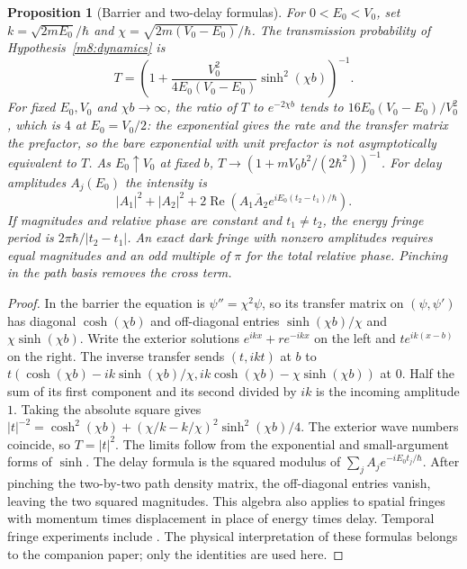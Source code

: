 \documentclass[11pt,reqno]{amsart}
\newtheorem{proposition}[theorem]{Proposition}
\theoremstyle{definition}
\theoremstyle{remark}
\numberwithin{equation}{section}
\begin{document}
\begin{proposition}[Barrier and two-delay formulas]\label{m8:barrier}
For $0<E_0<V_0$, set $k=\sqrt{2mE_0}/\hbar$ and
$\chi=\sqrt{2m(V_0-E_0)}/\hbar$. The transmission probability of
Hypothesis~\ref{m8:dynamics} is
\[
 T=\left(1+\frac{V_0^2}{4E_0(V_0-E_0)}\sinh^2(\chi b)\right)^{-1}.
\]
For fixed $E_0,V_0$ and $\chi b\to\infty$, the ratio of $T$ to
$e^{-2\chi b}$ tends to $16E_0(V_0-E_0)/V_0^2$, which is $4$ at $E_0=V_0/2$: the exponential gives the rate and the transfer matrix
the prefactor, so the bare exponential with unit prefactor is not asymptotically equivalent to $T$. As $E_0\uparrow V_0$
at fixed $b$, $T\to(1+mV_0b^2/(2\hbar^2))^{-1}$.
For delay amplitudes $A_j(E_0)$ the intensity is
\[
 |A_1|^2+|A_2|^2+
 2\operatorname{Re}\!\left(A_1\overline A_2
                e^{iE_0(t_2-t_1)/\hbar}\right).
\]
If magnitudes and relative phase are constant and $t_1\ne t_2$,
the energy fringe period is $2\pi\hbar/|t_2-t_1|$.
An exact dark fringe with nonzero amplitudes requires equal
magnitudes and an odd multiple of $\pi$ for the total relative
phase. Pinching in the path basis removes the cross term.
\end{proposition}
\begin{proof}
In the barrier the equation is $\psi''=\chi^2\psi$, so its
transfer matrix on $(\psi,\psi')$ has diagonal $\cosh(\chi b)$
and off-diagonal entries $\sinh(\chi b)/\chi$ and
$\chi\sinh(\chi b)$. Write the exterior solutions
$e^{ikx}+r e^{-ikx}$ on the left and $t e^{ik(x-b)}$ on the
right. The inverse transfer sends $(t,ikt)$ at $b$ to
$t(\cosh(\chi b)-ik\sinh(\chi b)/\chi,
ik\cosh(\chi b)-\chi\sinh(\chi b))$ at $0$.
Half the sum of its first component and its second divided by
$ik$ is the incoming amplitude $1$. Taking the absolute square gives
$|t|^{-2}=\cosh^2(\chi b)+(\chi/k-k/\chi)^2\sinh^2(\chi b)/4$.
The exterior wave numbers coincide, so $T=|t|^2$.
The limits follow from the exponential and small-argument forms
of $\sinh$. The delay formula is the squared modulus of
$\sum_j A_j e^{-iE_0t_j/\hbar}$. After pinching the two-by-two
path density matrix, the off-diagonal entries vanish, leaving
the two squared magnitudes. This algebra also applies to spatial
fringes with momentum times displacement in place of energy
times delay. Temporal fringe experiments include
\cite{m8:lindner,m8:tirode}.  The physical interpretation of these formulas belongs to the companion paper; only the identities are
used here.
\end{proof}
\end{document}
